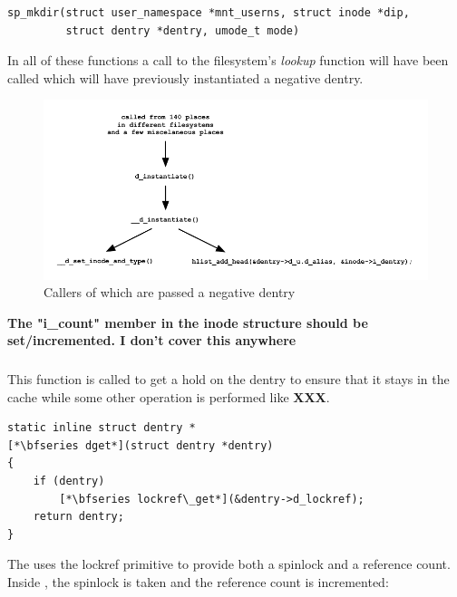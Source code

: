 \begin{lstlisting}
sp_mkdir(struct user_namespace *mnt_userns, struct inode *dip,
         struct dentry *dentry, umode_t mode)
\end{lstlisting}

\noindent
In all of these functions a call to the filesystem's \textit{lookup} function will have been called which will have previously instantiated a negative dentry.

\begin{figure}[h]
	\includegraphics[scale=0.8]{figures/d-instantiate.pdf}
	\centering
	\caption{Callers of  which are passed a negative dentry}
	\label{fig:d-instantiate}
\end{figure}

\noindent
\textbf{The "i\_count" member in the inode structure should be set/incremented. I don't cover this anywhere}


\subsubsection{}

This function is called to get a hold on the dentry to ensure that it stays in the cache while some other operation is performed like \textbf{XXX}.

\begin{lstlisting}
static inline struct dentry *
[*\bfseries dget*](struct dentry *dentry)
{
    if (dentry)
        [*\bfseries lockref\_get*](&dentry->d_lockref);
    return dentry;
}
\end{lstlisting}

\noindent
The  uses the lockref primitive to provide both a spinlock and a reference count. Inside , the spinlock is taken and the reference count is incremented:

